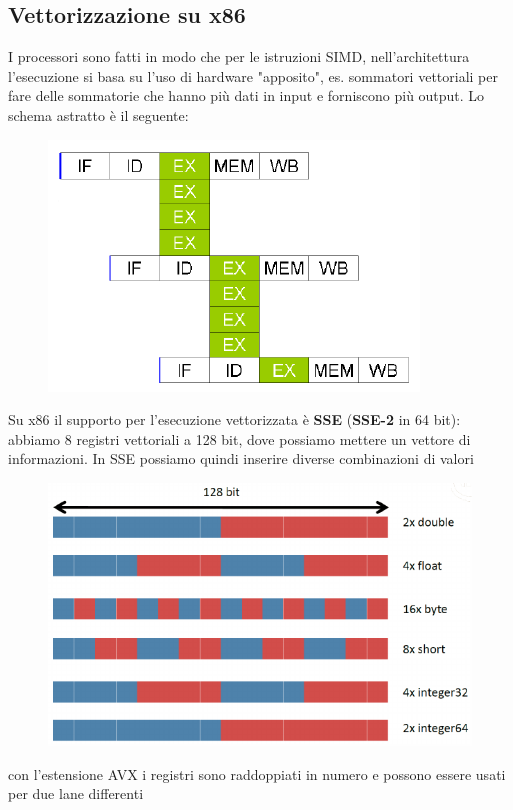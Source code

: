 \documentclass[12pt, oneside]{extbook}
\begin{document}
\subsection{Vettorizzazione su x86}
I processori sono fatti in modo che per le istruzioni SIMD, nell'architettura l'esecuzione si basa su l'uso di hardware "apposito", es. sommatori vettoriali per fare delle sommatorie che hanno più dati in input e forniscono più output. Lo schema astratto è il seguente:
\begin{figure}[!h]
\includegraphics[scale=0.5]{immagini/exec_vettorizzata.png}
\end{figure}
Su x86 il supporto per l'esecuzione vettorizzata è \textbf{SSE} (\textbf{SSE-2} in 64 bit): abbiamo 8 registri vettoriali a 128 bit, dove possiamo mettere un vettore di informazioni. In SSE possiamo quindi inserire diverse combinazioni di valori
\begin{figure}[!h]
\includegraphics[scale=0.5]{immagini/sse_data.png}
\end{figure}
con l'estensione AVX i registri sono raddoppiati in numero e possono essere usati per due lane differenti
\end{document}
